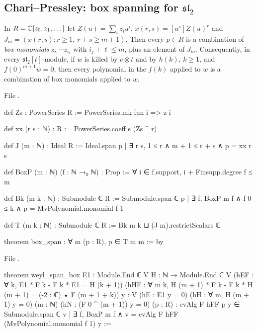 \subsection{Chari--Pressley: box spanning for $\mathfrak{sl}_2$}

\begin{theorem}\label{l26:thm:box}
In $R={\mathbb{C}}[z_0,z_1,\dots]$ let $Z(u)=\sum_iz_iu^i$, $x(r,s)=[u^s]Z(u)^r$ and $J_m=(x(r,s):r\ge1,\ r+s\ge m+1)$. Then every
$p\in R$ is a combination of \emph{box monomials} $z_{i_1}\cdots z_{i_\ell}$ with $i_j+\ell\le m$, plus an element of $J_m$.
Consequently, in every $\mathfrak{sl}_2[t]$-module, if $w$ is killed by $e\otimes t$ and by $h(k)$, $k\ge1$, and
$f(0)^{m+1}w=0$, then every polynomial in the $f(k)$ applied to $w$ is a combination of box monomials applied to $w$.
\end{theorem}
\noindent File .
\begin{leancode}
def Zs : PowerSeries R := PowerSeries.mk fun i => z i

def xx (r s : ℕ) : R := PowerSeries.coeff s (Zs ^ r)

def J (m : ℕ) : Ideal R := Ideal.span {p | ∃ r s, 1 ≤ r ∧ m + 1 ≤ r + s ∧ p = xx r s}

def BoxP (m : ℕ) (f : ℕ →₀ ℕ) : Prop := ∀ i ∈ f.support, i + Finsupp.degree f ≤ m

def Bk (m k : ℕ) : Submodule ℂ R :=
  Submodule.span ℂ {p | ∃ f, BoxP m f ∧ f 0 ≤ k ∧ p = MvPolynomial.monomial f 1}

def T (m k : ℕ) : Submodule ℂ R := Bk m k ⊔ (J m).restrictScalars ℂ

theorem box_span : ∀ m (p : R), p ∈ T m m := by
\end{leancode}
\noindent File .
\begin{leancode}
theorem weyl_span_box {E1 : Module.End ℂ V} {H : ℕ → Module.End ℂ V}
    (hEF : ∀ k, E1 * F k - F k * E1 = H (k + 1))
    (hHF : ∀ m k, H (m + 1) * F k - F k * H (m + 1) = (-2 : ℂ) • F (m + 1 + k))
    {y : V} (hE : E1 y = 0) (hH : ∀ m, H (m + 1) y = 0) (m : ℕ) (hN : (F 0 ^ (m + 1)) y = 0)
    (p : R) :
    evAlg F hFF p y ∈
      Submodule.span ℂ {v | ∃ f, BoxP m f ∧ v = evAlg F hFF (MvPolynomial.monomial f 1) y} :=
\end{leancode}

